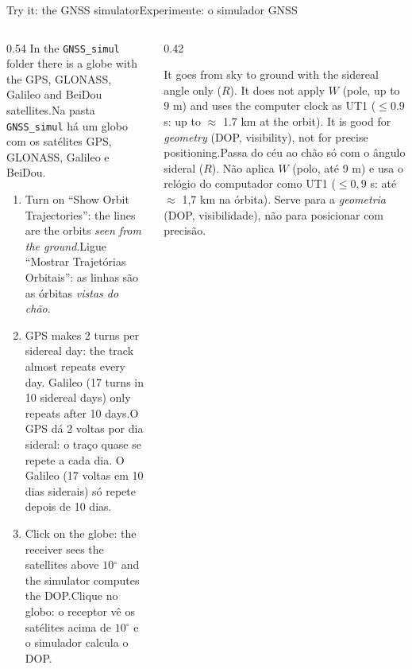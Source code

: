 \documentclass[aspectratio=169,11pt]{beamer}
\newcommand{\tr}[2]{\ifEN#2\else#1\fi}
\newcommand{\gr}{\ensuremath{{}^{\circ}}}
\begin{document}
\begin{frame}{\tr{Experimente: o simulador GNSS}{Try it: the GNSS simulator}}
  \begin{columns}[T]
    \begin{column}{0.54\textwidth}
      \small
      \tr{Na pasta \texttt{GNSS\_simul} há um globo com os satélites GPS, GLONASS, Galileo e BeiDou.}{In the \texttt{GNSS\_simul} folder there is a globe with the GPS, GLONASS, Galileo and BeiDou satellites.}
      \begin{enumerate}
        \setlength{\itemsep}{2pt}
        \item \tr{Ligue ``Mostrar Trajetórias Orbitais'': as linhas são as órbitas \emph{vistas do chão}.}{Turn on ``Show Orbit Trajectories'': the lines are the orbits \emph{seen from the ground}.}
        \item \tr{O GPS dá 2 voltas por dia sideral: o traço quase se repete a cada dia. O Galileo (17 voltas em 10 dias siderais) só repete depois de 10 dias.}{GPS makes 2 turns per sidereal day: the track almost repeats every day. Galileo (17 turns in 10 sidereal days) only repeats after 10 days.}
        \item \tr{Clique no globo: o receptor vê os satélites acima de $10\gr$ e o simulador calcula o DOP.}{Click on the globe: the receiver sees the satellites above $10\gr$ and the simulator computes the DOP.}
      \end{enumerate}
    \end{column}
    \begin{column}{0.42\textwidth}
      \begin{cuidado}[title={\tr{O que ele deixa de fora}{What it leaves out}}]
        \footnotesize\tr{Passa do céu ao chão só com o ângulo sideral ($R$). Não aplica $W$ (polo, até 9 m) e usa o relógio do computador como UT1 ($\le 0{,}9$ s: até $\approx$ 1,7 km na órbita). Serve para a \emph{geometria} (DOP, visibilidade), não para posicionar com precisão.}{It goes from sky to ground with the sidereal angle only ($R$). It does not apply $W$ (pole, up to 9 m) and uses the computer clock as UT1 ($\le 0.9$ s: up to $\approx$ 1.7 km at the orbit). It is good for \emph{geometry} (DOP, visibility), not for precise positioning.}
      \end{cuidado}
    \end{column}
  \end{columns}
\end{frame}
\end{document}
